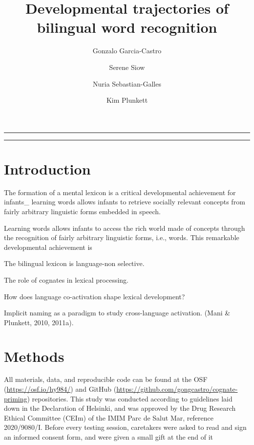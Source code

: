 \documentclass[
  letterpaper,
  DIV=11,
  numbers=noendperiod]{scrartcl}
\title{Developmental trajectories of bilingual word recognition}
\author{Gonzalo Garcia-Castro \and Serene Siow \and Nuria
Sebastian-Galles \and Kim Plunkett}
\date{}
\begin{document}
\maketitle
\ifdefined\Shaded\renewenvironment{Shaded}{\begin{tcolorbox}[boxrule=0pt, borderline west={3pt}{0pt}{shadecolor}, frame hidden, sharp corners, enhanced, interior hidden, breakable]}{\end{tcolorbox}}\fi

\begin{center}\rule{0.5\linewidth}{0.5pt}\end{center}

\begin{center}\rule{0.5\linewidth}{0.5pt}\end{center}

\hypertarget{introduction}{%
\section{Introduction}\label{introduction}}

The formation of a mental lexicon is a critical developmental
achievement for infants\_ learning words allows infants to retrieve
socially relevant concepts from fairly arbitrary linguistic forms
embedded in speech.

Learning words allows infants to access the rich world made of concepts
through the recognition of fairly arbitrary linguistic forms, i.e.,
words. This remarkable developmental achievement is

The bilingual lexicon is language-non selective.

The role of cognates in lexical processing.

How does language co-activation shape lexical development?

Implicit naming as a paradigm to study cross-language activation. (Mani
\& Plunkett, 2010, 2011a).

\hypertarget{methods}{%
\section{Methods}\label{methods}}

All materials, data, and reproducible code can be found at the OSF
(\href{https://osf.io/ckydb/}{https://osf.io/hy984/}) and GitHub
(\url{https://github.com/gongcastro/cognate-priming}) repositories. This
study was conducted according to guidelines laid down in the Declaration
of Helsinki, and was approved by the Drug Research Ethical Committee
(CEIm) of the IMIM Parc de Salut Mar, reference 2020/9080/I. Before
every testing session, caretakers were asked to read and sign an
informed consent form, and were given a small gift at the end of it
\end{document}
